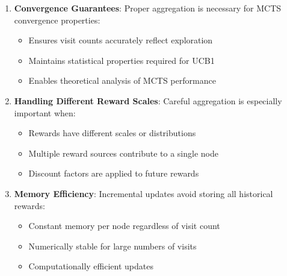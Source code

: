 \begin{itemize}
\begin{enumerate}
        \item \textbf{Convergence Guarantees}: Proper aggregation is necessary for MCTS convergence properties:
        \begin{itemize}
            \item Ensures visit counts accurately reflect exploration
            \item Maintains statistical properties required for UCB1
            \item Enables theoretical analysis of MCTS performance
        \end{itemize}
        
        \item \textbf{Handling Different Reward Scales}: Careful aggregation is especially important when:
        \begin{itemize}
            \item Rewards have different scales or distributions
            \item Multiple reward sources contribute to a single node
            \item Discount factors are applied to future rewards
        \end{itemize}
        
        \item \textbf{Memory Efficiency}: Incremental updates avoid storing all historical rewards:
        \begin{itemize}
            \item Constant memory per node regardless of visit count
            \item Numerically stable for large numbers of visits
            \item Computationally efficient updates
        \end{itemize}
    \end{enumerate}
\end{itemize}


